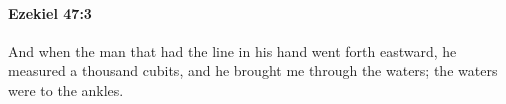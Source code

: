 
		\paragraph{Ezekiel 47:3} %
			\label{EZEKIEL-47-3}

			And when the man that had the line in his hand went forth eastward, he measured a thousand cubits, and he brought me through the waters; the waters were to the ankles.


